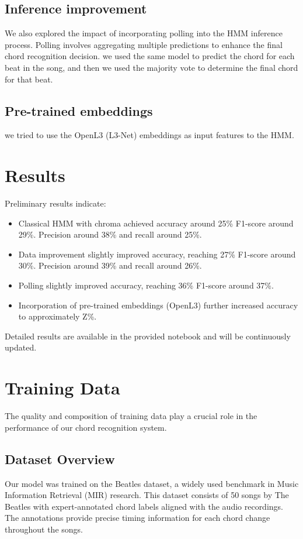 \documentclass{article}
\begin{document}
\subsection{Inference improvement}
We also explored the impact of incorporating polling into the HMM inference process.
Polling involves aggregating multiple predictions to enhance the final chord recognition decision.
we used the same model to predict the chord for each beat in the song, and then we used the majority vote to determine the final chord for that beat.

\subsection{Pre-trained embeddings}
we tried to use the OpenL3 (L3-Net) embeddings as input features to the HMM.



\section{Results}
Preliminary results indicate:
\begin{itemize}
    \item Classical HMM with chroma achieved accuracy around 25\% F1-score around 29\%. Precision around 38\% and recall around 25\%.
    \item Data improvement slightly improved accuracy, reaching 27\% F1-score around 30\%. Precision around 39\% and recall around 26\%.
    \item Polling slightly improved accuracy, reaching 36\% F1-score around 37\%.
    \item Incorporation of pre-trained embeddings (OpenL3) further increased accuracy to approximately Z\%.
\end{itemize}
Detailed results are available in the provided notebook and will be continuously updated.

\section{Training Data}
\label{sec:training_data}

The quality and composition of training data play a crucial role in the performance of our chord recognition system.

\subsection{Dataset Overview}
Our model was trained on the Beatles dataset, a widely used benchmark in Music Information Retrieval (MIR) research.
 This dataset consists of 50 songs by The Beatles with expert-annotated chord labels aligned with the audio recordings.
 The annotations provide precise timing information for each chord change throughout the songs.
\end{document}
